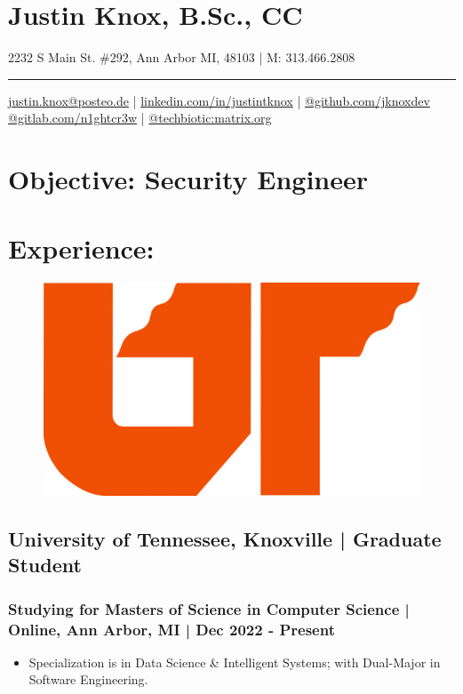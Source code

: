 \documentclass[letter,10pt]{article}
\author{arx}
\date{\today}
\title{}
\begin{document}
\section*{Justin Knox, B.Sc., CC}
\label{sec:orgc57b736}
2232 S Main St. \#292, Ann Arbor MI, 48103 | M: 313.466.2808

\noindent\rule{\textwidth}{0.5pt}
\href{mailto:justin.knox@posteo.de}{justin.knox@posteo.de} | \href{https://www.linkedin.com/in/justintknox}{linkedin.com/in/justintknox} | \href{https://www.github.com/jknoxdev}{@github.com/jknoxdev} \\
\href{https://gitlab.com/n1ghtcr3w}{@gitlab.com/n1ghtcr3w} | \href{https://matrix.to/\#/@techbiotic:matrix.org}{@techbiotic:matrix.org} 


\section*{Objective:              Security Engineer}
\label{sec:org22f81e8}
\section*{Experience:}
\label{sec:orgbdf0552}
\begin{figure}
\includegraphics[width=0.45\linewidth]{./img/50p_cr_utk.jpg}
\end{figure}

\subsection*{University of Tennessee, Knoxville | Graduate Student}
\label{sec:org7e3bad5}
\subsubsection*{Studying for Masters of Science in Computer Science | Online, Ann Arbor, MI | Dec 2022 - Present}
\label{sec:org12ebaf0}
\begin{itemize}
\item Specialization is in Data Science \& Intelligent Systems; with Dual-Major in Software Engineering.
\end{itemize}
\end{document}
